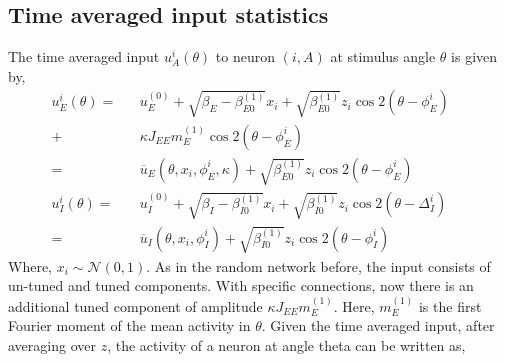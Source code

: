 \subsection{Time averaged input statistics}
The time averaged input $u_A^{i} (\theta)$ to neuron $(i, A)$ at stimulus angle $\theta$ is given by, 
\begin{eqnarray}
\label{ueOfTheta}
u_E^{i} (\theta) =&& u^{(0)}_E + \sqrt{\beta_E - \beta_{E0}^{(1)}} x_i +  \sqrt{\beta_{E0}^{(1)}} z_i \cos 2 (\theta - \phi_E^i) \,\,\,\, \,\,\,\,\nonumber \\
+&& \kappa J_{EE} m_E^{(1)} \cos 2 ( \theta  - \phi_E^i) \\
=&& \overline{u}_E(\theta, x_i, \phi_E^i, \kappa) +  \sqrt{\beta_{E0}^{(1)}} z_i \cos 2 (\theta - \phi_E^i) \\
u_I^{i} (\theta) =&& u^{(0)}_I + \sqrt{\beta_I - \beta_{I0}^{(1)}} x_i +  \sqrt{\beta_{I0}^{(1)}} z_i \cos 2 (\theta - \Delta_I^i) \\
=&& \overline{u}_I(\theta, x_i, \phi_I^i) +  \sqrt{\beta_{I0}^{(1)}} z_i \cos 2 (\theta - \phi_I^i)
\end{eqnarray}
Where, $x_i \sim \mathcal{N}(0, 1)$.  As in the random network before, the input consists of un-tuned and tuned components. With specific connections, now there is an additional tuned component of amplitude  $\kappa J_{EE} m_E^{(1)}$. Here, $m_E^{(1)}$ is the first Fourier moment of the mean activity in $\theta$. 
Given the time averaged input, after averaging over $z$, the activity of a neuron at angle theta can be written as, 

